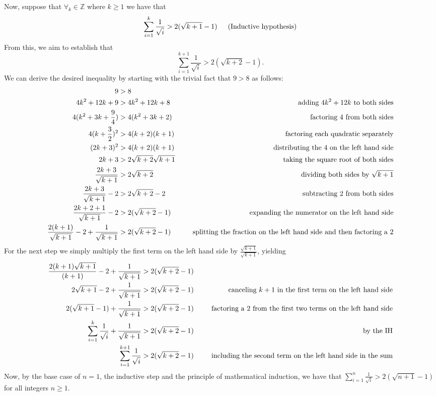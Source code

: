 \documentclass[11pt, letterpaper]{article}
\begin{document}
\begin{prf}[by induction]
     Now, suppose that $\forall_k \in \mathbb{Z}$ where $k\geq 1$ we have that 
    \[\sum_{i=1}^{k}\frac{1}{\sqrt{i}}>2(\sqrt{k+1}-1) \text{\indent (Inductive hypothesis)}\]
    From this, we aim to establish that 
    \[\sum_{i=1}^{k+1}\frac{1}{\sqrt{i}}>2(\sqrt{k+2}-1).\]
    We can derive the desired inequality by starting with the trivial fact that $9>8$ as follows:
    \begin{align*}
        9 &>8\\
        4k^2+12k+9 &> 4k^2+12k+8 &\text{\indent adding $4k^2+12k$ to both sides}\\
        4(k^2+3k+\frac{9}{4}) &> 4(k^2+3k+2) &\text{\indent factoring 4 from both sides}\\
        4(k+\frac{3}{2})^2 &> 4(k+2)(k+1) &\text{\indent factoring each quadratic separately}\\
        (2k+3)^2 &> 4(k+2)(k+1) &\text{\indent distributing the $4$ on the left hand side}\\
        2k+3 &> 2\sqrt{k+2}\sqrt{k+1} &\text{\indent taking the square root of both sides}\\
        \frac{2k+3}{\sqrt{k+1}} &> 2\sqrt{k+2} &\text{\indent dividing both sides by $\sqrt{k+1}$}\\
        \frac{2k+3}{\sqrt{k+1}}-2 &> 2\sqrt{k+2}-2 &\text{\indent subtracting 2 from both sides}\\
        \frac{2k+2+1}{\sqrt{k+1}}-2 &> 2(\sqrt{k+2}-1) &\text{\indent expanding the numerator on the left hand side}\\
        \frac{2(k+1)}{\sqrt{k+1}}-2+\frac{1}{\sqrt{k+1}} &> 2(\sqrt{k+2}-1) &\text{\indent splitting the fraction on the left hand side and then factoring a 2}
    \end{align*}
    For the next step we simply multiply the first term on the left hand side by $\frac{\sqrt{k+1}}{\sqrt{k+1}}$, yielding
    \begin{align*}
        \frac{2(k+1)\sqrt{k+1}}{(k+1)}-2+\frac{1}{\sqrt{k+1}} &> 2(\sqrt{k+2}-1)\\
        2\sqrt{k+1}-2+\frac{1}{\sqrt{k+1}} &> 2(\sqrt{k+2}-1) &\text{\indent canceling $k+1$ in the first term on the left hand side}\\
        2(\sqrt{k+1}-1)+\frac{1}{\sqrt{k+1}} &> 2(\sqrt{k+2}-1) &\text{\indent factoring a 2 from the first two terms on the left hand side}\\
        \sum_{i=1}^{k}\frac{1}{\sqrt{i}}+\frac{1}{\sqrt{k+1}} &> 2(\sqrt{k+2}-1) &\text{\indent by the IH}\\
        \sum_{i=1}^{k+1}\frac{1}{\sqrt{i}} &> 2(\sqrt{k+2}-1) &\text{\indent including the second term on the left hand side in the sum}\\
    \end{align*}
    Now, by the base case of $n=1$, the inductive step and the principle of mathematical induction, we have that $\sum_{i=1}^{n}\frac{1}{\sqrt{i}}>2(\sqrt{n+1}-1)$ for all integers $n\geq 1$.
\end{prf}
\end{document}
